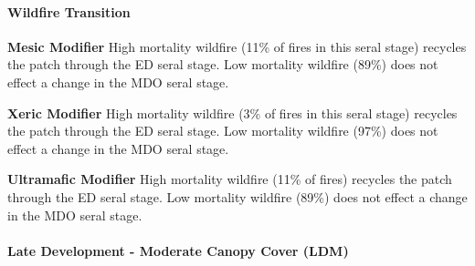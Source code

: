 \paragraph{Wildfire Transition}
\begin{adjustwidth}{2cm}{}
\textbf{Mesic Modifier } High mortality wildfire (11\% of fires in this seral stage) recycles the patch through the ED seral stage. Low mortality wildfire (89\%) does not effect a change in the MDO seral stage. 

\medskip
\noindent \textbf{Xeric Modifier} High mortality wildfire (3\% of fires in this seral stage) recycles the patch through the ED seral stage. Low mortality wildfire (97\%) does not effect a change in the MDO seral stage.

\medskip
\noindent \textbf{Ultramafic Modifier} High mortality wildfire (11\% of fires) recycles the patch through the ED seral stage. Low mortality wildfire (89\%) does not effect a change in the MDO seral stage.

\end{adjustwidth}
\noindent\hrulefill

\paragraph{Late Development - Moderate Canopy Cover (LDM)}

